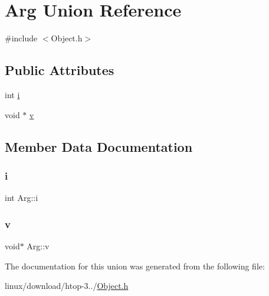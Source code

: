 \hypertarget{unionArg}{}\section{Arg Union Reference}
\label{unionArg}


{\ttfamily \#include $<$Object.\+h$>$}

\subsection*{Public Attributes}
\begin{DoxyCompactItemize}
\item 
int \hyperlink{unionArg_a9fc90466ebe59415acda831056fdb9ca}{i}
\item 
void $\ast$ \hyperlink{unionArg_ad7750dc382e9c46b76078286f313f4e4}{v}
\end{DoxyCompactItemize}


\subsection{Member Data Documentation}
\mbox{\label{unionArg_a9fc90466ebe59415acda831056fdb9ca}} 
\subsubsection{\texorpdfstring{i}{i}}
{\footnotesize\ttfamily int Arg\+::i}

\mbox{\label{unionArg_ad7750dc382e9c46b76078286f313f4e4}} 
\subsubsection{\texorpdfstring{v}{v}}
{\footnotesize\ttfamily void$\ast$ Arg\+::v}



The documentation for this union was generated from the following file\+:\begin{DoxyCompactItemize}
\item 
linux/download/htop-\/3../\hyperlink{Object_8h}{Object.\+h}\end{DoxyCompactItemize}
